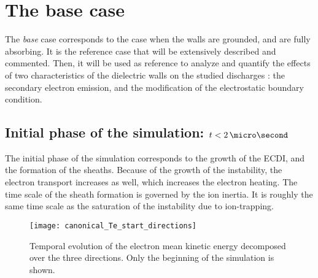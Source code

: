 
\section{The base case}
  \label{sec-canonical}
  
  
  The {\it base} case corresponds to the case when the walls are grounded, and are fully absorbing. 
  It is the reference case that will be extensively described and commented.
  Then, it will be used as reference to analyze and quantify the effects of two characteristics of the dielectric walls on the studied discharges : the secondary electron emission, and the modification of the electrostatic boundary condition.
  
  \subsection{Initial phase of the simulation\string: \texorpdfstring{$t < 2\,\micro\second$}{ t < 2 microseconds} } \label{subsec-initlaphase}
  
  The initial phase of the simulation corresponds to the growth of the \ac{ECDI}, and the formation of the sheaths.
  Because of the growth of the instability, the electron transport increases as well, which increases the electron heating.
  The time scale of the sheath formation is governed by the ion inertia.
  It is roughly the same time scale as the saturation of the instability due to ion-trapping.
  
  \begin{figure}[hbt]
    \centering
    \texttt{[image: canonical\_Te\_start\_directions]}
    \caption{Temporal evolution of the electron mean kinetic energy decomposed over the three directions. Only the beginning of the simulation is shown.}
    \label{fig-canon_Te_strat}
  \end{figure}
  
